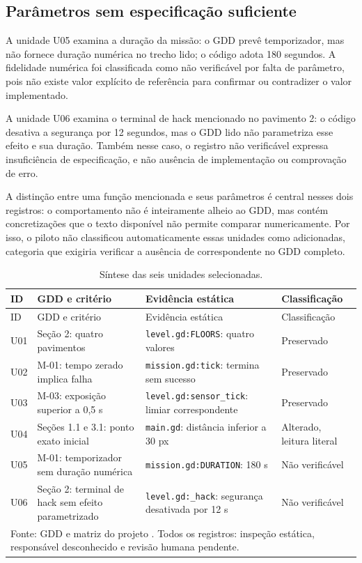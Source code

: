 \subsection{Parâmetros sem especificação suficiente}
A unidade U05 examina a duração da missão: o GDD prevê temporizador, mas não fornece duração numérica no trecho lido; o código adota 180 segundos. A fidelidade numérica foi classificada como não verificável por falta de parâmetro, pois não existe valor explícito de referência para confirmar ou contradizer o valor implementado.

A unidade U06 examina o terminal de hack mencionado no pavimento 2: o código desativa a segurança por 12 segundos, mas o GDD lido não parametriza esse efeito e sua duração. Também nesse caso, o registro não verificável expressa insuficiência de especificação, e não ausência de implementação ou comprovação de erro.

A distinção entre uma função mencionada e seus parâmetros é central nesses dois registros: o comportamento não é inteiramente alheio ao GDD, mas contém concretizações que o texto disponível não permite comparar numericamente. Por isso, o piloto não classificou automaticamente essas unidades como adicionadas, categoria que exigiria verificar a ausência de correspondente no GDD completo.

\begin{singlespace}
\begin{longtable}{p{}p{}p{}p{}}
\caption{Síntese das seis unidades selecionadas.}\label{tab:results}\\
\toprule ID & GDD e critério & Evidência estática & Classificação \\\midrule\endfirsthead
\toprule ID & GDD e critério & Evidência estática & Classificação \\\midrule\endhead
U01 & Seção 2: quatro pavimentos & \texttt{level.gd:FLOORS}: quatro valores & Preservado\\
U02 & M-01: tempo zerado implica falha & \texttt{mission.gd:tick}: termina sem sucesso & Preservado\\
U03 & M-03: exposição superior a 0,5 s & \texttt{level.gd:sensor\_tick}: limiar correspondente & Preservado\\
U04 & Seções 1.1 e 3.1: ponto exato inicial & \texttt{main.gd}: distância inferior a 30 px & Alterado, leitura literal\\
U05 & M-01: temporizador sem duração numérica & \texttt{mission.gd:DURATION}: 180 s & Não verificável\\
U06 & Seção 2: terminal de hack sem efeito parametrizado & \texttt{level.gd:\_hack}: segurança desativada por 12 s & Não verificável\\
\bottomrule
\multicolumn{4}{p{0.93\textwidth}}{\footnotesize Fonte: GDD  e matriz do projeto . Todos os registros: inspeção estática, responsável desconhecido e revisão humana pendente.}\\
\end{longtable}
\end{singlespace}

